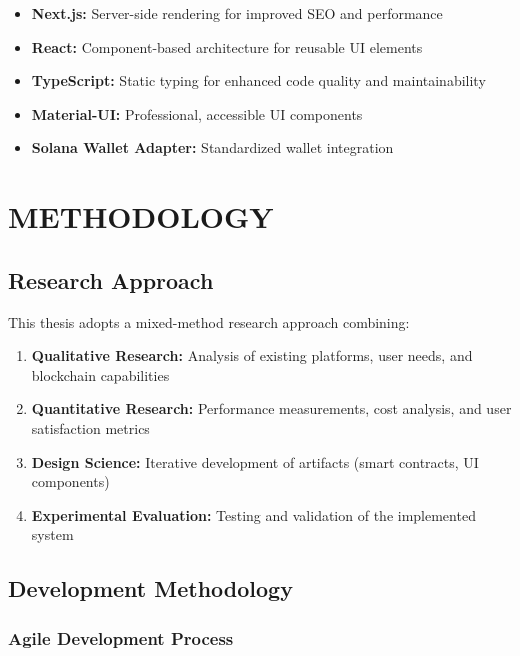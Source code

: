 \documentclass[a4paper,13pt,twoside]{report}
\theoremstyle{definition}
\begin{document}
\begin{itemize}
    \item \textbf{Next.js:} Server-side rendering for improved SEO and performance
    \item \textbf{React:} Component-based architecture for reusable UI elements
    \item \textbf{TypeScript:} Static typing for enhanced code quality and maintainability
    \item \textbf{Material-UI:} Professional, accessible UI components
    \item \textbf{Solana Wallet Adapter:} Standardized wallet integration
\end{itemize}

\newpage
\chapter{METHODOLOGY}
\label{chapter:Methodology}

\section{Research Approach}

This thesis adopts a mixed-method research approach combining:

\begin{enumerate}
    \item \textbf{Qualitative Research:} Analysis of existing platforms, user needs, and blockchain capabilities
    \item \textbf{Quantitative Research:} Performance measurements, cost analysis, and user satisfaction metrics
    \item \textbf{Design Science:} Iterative development of artifacts (smart contracts, UI components)
    \item \textbf{Experimental Evaluation:} Testing and validation of the implemented system
\end{enumerate}

\section{Development Methodology}

\subsection{Agile Development Process}
\end{document}
